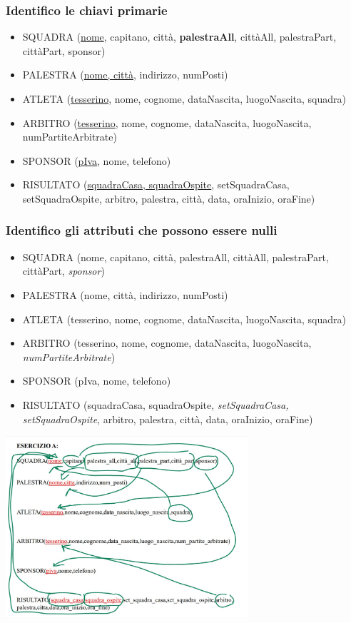\subsubsection{Identifico le chiavi primarie}
\begin{itemize}
    \item SQUADRA (\underline{nome}, capitano, città, \textbf{palestraAll}, cittàAll, palestraPart, cittàPart, sponsor)
    \item PALESTRA (\underline{nome, città}, indirizzo, numPosti)
    \item ATLETA (\underline{tesserino}, nome, cognome, dataNascita, luogoNascita, squadra)
    \item ARBITRO (\underline{tesserino}, nome, cognome, dataNascita, luogoNascita, numPartiteArbitrate)
    \item SPONSOR (\underline{pIva}, nome, telefono)
    \item RISULTATO (\underline{squadraCasa, squadraOspite}, setSquadraCasa, setSquadraOspite, arbitro, palestra, città, data, oraInizio, oraFine)
\end{itemize}

\subsubsection{Identifico gli attributi che possono essere nulli}
\begin{itemize}
    \item SQUADRA (nome, capitano, città, palestraAll, cittàAll, palestraPart, cittàPart, \textit{sponsor})
    \item PALESTRA (nome, città, indirizzo, numPosti)
    \item ATLETA (tesserino, nome, cognome, dataNascita, luogoNascita, squadra)
    \item ARBITRO (tesserino, nome, cognome, dataNascita, luogoNascita, \textit{numPartiteArbitrate})
    \item SPONSOR (pIva, nome, telefono)
    \item RISULTATO (squadraCasa, squadraOspite, \textit{setSquadraCasa, setSquadraOspite}, arbitro, palestra, città, data, oraInizio, oraFine)
\end{itemize}
\begin{center}
    \includegraphics[width=0.675\textwidth]{chaptersLezioniSara/img/MR_fileesA.jpg}
\end{center}

